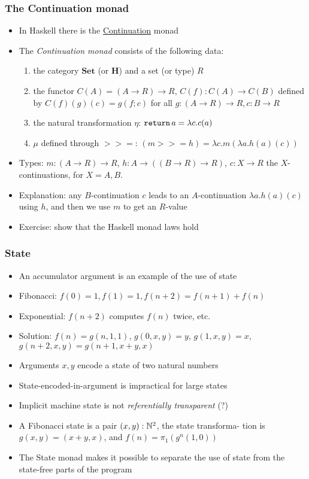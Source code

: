 \documentclass[handout]{beamer}
\newcommand{\bfsf}[1]{{\boldsymbol{#1}}}
\newcommand{\Set}{\bfsf{Set}}
\newcommand{\HH}{\bfsf{H}}
\newcommand{\bind}{{>}\!\!{>}\!{=}}
\newcommand{\ttt}[1]{\text{\tt #1}}
\begin{document}
\frame
  {   
    \frametitle{The Continuation monad}\label{Mon5:MonadCont}

 \begin{itemize}[<+->]
\item In Haskell there is the 
\href{https://wiki.haskell.org/All_About_Monads\#The_Continuation\_monad}%
{\color{blue}Continuation} monad
\item The \emph{Continuation monad} consists of the following data:
 \begin{enumerate}
    \item the category $\Set$ (or $\HH$) and a set (or type) $R$
    \item the functor $C(A) = (A\to R)\to R$, $C(f) : C(A)\to C(B)$ defined by
$C(f)(g)(c) = g(f;c)$ for all $g: (A\to R)\to R, c: B\to R$ 
    \item the natural transformation $\eta$: $\ttt{return}\, a = \lambda c. c(a)$
    \item $\mu$ defined through $\bind$: %
$(m \bind h) =  \lambda c. m(\lambda a. h(a)(c))$
 \end{enumerate}
\item Types: $m: (A\to R)\to R$, $h: A\to ((B\to R)\to R)$, 
$c: X\to R$ the $X$-continuations, for $X=A,B$.
\item Explanation: any $B$-continuation $c$ leads to an $A$-continuation 
$\lambda a. h(a)(c)$ using $h$, and then we use $m$ to get an $R$-value
\item Exercise: show that the Haskell monad laws hold
 \end{itemize}

 }

\frame
  {   
    \frametitle{State}\label{Mon5:State}

 \begin{itemize}[<+->]
\item An accumulator argument is an example of the use of state
\item Fibonacci: $f(0)=1, f(1)=1, f(n+2)=f(n+1)+f(n)$
\item Exponential: $f(n+2)$ computes $f(n)$ twice, etc.
\item Solution: $f(n)=g(n,1,1)$, $g(0,x,y)=y$, $g(1,x,y)=x$, $g(n+2,x,y)=g(n+1,x+y,x)$
\item Arguments $x,y$ encode a state of two natural numbers 
\item State-encoded-in-argument is impractical  for large states
\item Implicit machine state is not \emph{referentially transparent} (?)
\item A Fibonacci state is a pair $(x,y) : \mathbb{N}^2$, the state transforma- tion
is $g(x,y)=(x+y,x)$, and $f(n) = \pi_1(g^n(1,0))$
\item The State monad makes it possible to separate the use of
state from the state-free parts of the program
 \end{itemize}

 }
\end{document}
